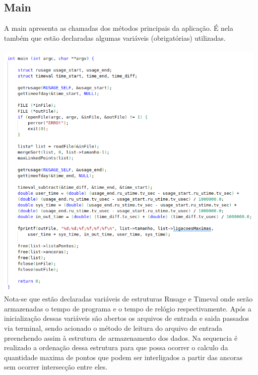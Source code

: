 \documentclass[12pt]{article}
\begin{document}
        \subsection{Main}
            A main apresenta as chamadas dos métodos principais da aplicação. É nela também
            que estão declaradas algumas variáveis (obrigatórias) utilizadas.\\\\
            \includegraphics[width=1.0\linewidth]{Figuras/1.1.png}\\
            Nota-se que estão declaradas variáveis de estruturas Rusage e Timeval onde serão
            armazenadas o tempo de programa e o tempo de relógio respectivamente.
            Após a inicialização dessas variáveis são abertos os arquivos de entrada e saida
            passados via terminal, sendo acionado o método de leitura do arquivo de entrada
            preenchendo assim à estrutura de armazenamento dos dados. Na sequencia é realizado
            a ordenação dessa estrutura para que possa ocorrer o calculo da quantidade maxima
            de pontos que podem ser interligados a partir das ancoras sem ocorrer intersecção 
            entre eles.      
\end{document}
